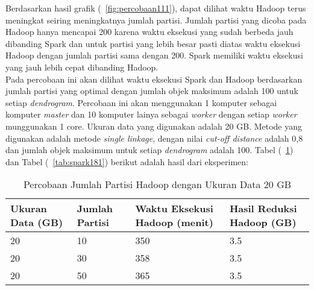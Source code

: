 Berdasarkan hasil grafik (~\ref{fig:percobaan111}), dapat dilihat waktu Hadoop terus meningkat seiring meningkatnya jumlah partisi. Jumlah partisi yang dicoba pada Hadoop hanya mencapai 200 karena waktu eksekusi yang sudah berbeda jauh dibanding Spark dan untuk partisi yang lebih besar pasti diatas waktu eksekusi Hadoop dengan jumlah partisi sama dengan 200. Spark memiliki waktu eksekusi yang jauh lebih cepat dibanding Hadoop. \\




Pada percobaan ini akan dilihat waktu eksekusi Spark dan Hadoop berdasarkan jumlah partisi yang optimal dengan jumlah objek maksimum adalah 100 untuk setiap \textit{dendrogram}. Percobaan ini akan menggunakan 1 komputer sebagai komputer \textit{master} dan 10 komputer lainya sebagai \textit{worker} dengan setiap \textit{worker} munggunakan 1 core. Ukuran data yang digunakan adalah 20 GB. Metode yang digunakan adalah metode \textit{single linkage}, dengan nilai \textit{cut-off distance} adalah 0,8 dan jumlah objek maksimum untuk setiap \textit{dendrogram} adalah 100. Tabel (~\ref{tab:spark171}) dan Tabel (~\ref{tab:spark181}) berikut adalah hasil dari eksperimen:





\begin{table}[H] 
	\centering 
	\caption{Percobaan Jumlah Partisi Hadoop dengan Ukuran Data 20 GB}
	\label{tab:spark171}
	\begin{tabular}{|p{3cm}|p{3cm}|p{4cm}|p{4cm}|}
\hline
Ukuran Data (GB) & Jumlah Partisi &  Waktu Eksekusi Hadoop (menit) & Hasil Reduksi Hadoop (GB)\\
\hline
20 & 10 & 350  & 3.5  \\
\hline
20 & 30 & 358  & 3.5  \\
\hline
20 & 50 & 365  & 3.5  \\
\hline


\hline

	\end{tabular} 
\end{table}




